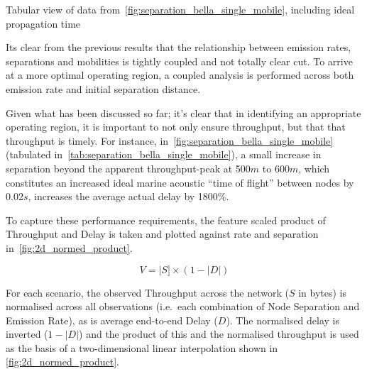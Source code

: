 \begin{table}[h]
	\caption{Tabular view of data from~\autoref{fig:separation_bella_single_mobile}, including ideal propagation time} \label{tab:separation_bella_single_mobile}
	\begin{center}
		
	\end{center}
\end{table}


\clearpage





Its clear from the previous results that the relationship between emission rates, separations and mobilities is tightly coupled and not totally clear cut. 
To arrive at a more optimal operating region, a coupled analysis is performed across both emission rate and initial separation distance.

Given what has been discussed so far; it's clear that in identifying an appropriate operating region, it is important to not only ensure throughput, but that that throughput is timely.
For instance, in~\autoref{fig:separation_bella_single_mobile} (tabulated in~\autoref{tab:separation_bella_single_mobile}), a small increase in separation beyond the apparent throughput-peak at 500$m$ to 600$m$, which constitutes an increased ideal marine acoustic ``time of flight'' between nodes by 0.02$s$, increases the average actual delay by 1800\%. 

To capture these performance requirements, the feature scaled product of Throughput and Delay is taken and plotted against rate and separation in~\autoref{fig:2d_normed_product}.

\begin{equation}
V = |S] \times (1 - |D|)
\label{eq:normed_product}
\end{equation}

For each scenario, the observed Throughput across the network ($S$ in bytes) is normalised across all observations (i.e.\ each combination of Node Separation and Emission Rate), as is average end-to-end Delay ($D$). The normalised delay is inverted ($1-|D|$) and the product of this and the normalised throughput is used as the basis of a two-dimensional linear interpolation shown in \autoref{fig:2d_normed_product}.




